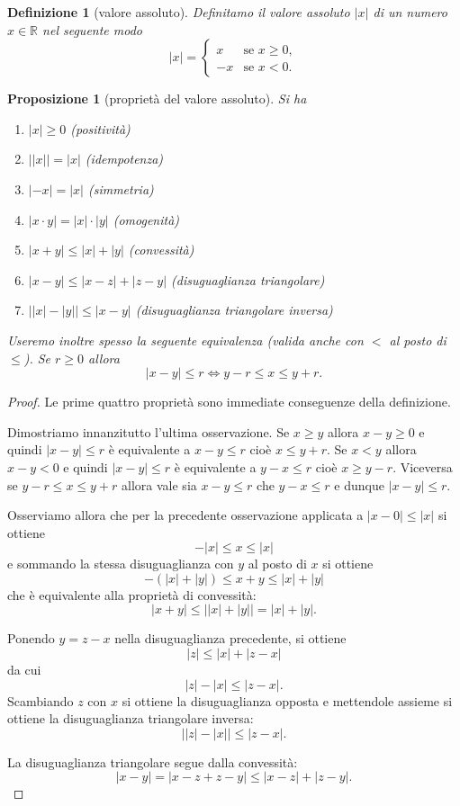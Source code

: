 \documentclass[italian,a4paper,oneside,headinclude]{scrbook}
\newcommand{\myemph}[1]{\emph{#1}\marginpar{#1}}
\newcommand{\RR}{\mathbb R}
\newcommand{\abs}[1]{{\left|#1\right|}}
\newtheorem{proposition}[theorem]{Proposizione}
\newtheorem{definition}[theorem]{Definizione}
\begin{document}
\begin{definition}[valore assoluto]
Definitamo il \myemph{valore assoluto} $\abs{x}$ di un numero $x\in \RR$ nel seguente modo
\[
\abs{x} =
\begin{cases}
  x & \text{se $x\ge 0$}, \\
  -x & \text{se $x<0 $}.
\end{cases}
\]
\end{definition}

\begin{proposition}[proprietà del valore assoluto]
Si ha
\begin{enumerate}
\item $\abs{x}\ge 0$ (positività)
\item $\big\lvert\abs{x}\big\rvert = \abs{x}$ (idempotenza)
\item $\abs{-x} = \abs{x}$ (simmetria)
\item $\abs{x\cdot y} = \abs{x}\cdot \abs{y}$ (omogenità)
\item $\abs{x+y} \le \abs{x} + \abs{y}$ (convessità)
\item $\abs{x-y} \le \abs{x-z} + \abs{z-y}$ (disuguaglianza triangolare)
\item $\big\lvert\abs{x}-\abs{y}\big\rvert \le \abs{x-y}$ (disuguaglianza triangolare inversa)
\end{enumerate}
Useremo inoltre spesso la seguente equivalenza (valida
anche con $<$ al posto di $\le$). Se $r\ge 0$ allora
\[
 \abs{x-y} \le r
 \iff
 y - r \le x \le y + r.
\]
\end{proposition}
%
\begin{proof}
Le prime quattro proprietà sono immediate conseguenze della definizione.

Dimostriamo innanzitutto l'ultima osservazione.
Se $x\ge y$ allora $x-y\ge 0$ e quindi $\abs{x-y} \le r$ è
equivalente a $x-y\le r$ cioè $x\le y+r$.
Se $x<y$ allora $x-y<0$ e quindi $\abs{x-y} \le r$ è
equivalente a $y-x \le r$ cioè $x\ge y-r$.
Viceversa se $y-r \le x \le y+r$ allora vale sia $x-y \le r$ che $y-x \le r$ e dunque $\abs{x-y}\le r$.

Osserviamo allora che per la precedente osservazione applicata
a $\abs{x-0} \le \abs{x}$ si ottiene
\[
  -\abs{x} \le x \le \abs{x}
\]
e sommando la stessa disuguaglianza con $y$ al posto di $x$ si
ottiene
\[
  -(\abs{x} + \abs{y}) \le x + y \le \abs{x} + \abs{y}
\]
che è equivalente alla proprietà di convessità:
\[
  \abs{x+y} \le \big\lvert\abs{x} + \abs{y}\big\rvert = \abs{x} + \abs{y}.
\]

Ponendo $y=z-x$ nella disuguaglianza precedente, si ottiene
\[
  \abs{z} \le \abs{x} + \abs{z-x}
\]
da cui
\[
  \abs{z} - \abs{x} \le \abs{z-x}.
\]
Scambiando $z$ con $x$ si ottiene la disuguaglianza opposta
e mettendole assieme si ottiene
la disuguaglianza triangolare inversa:
\[
\big\lvert \abs{z}-\abs{x} \big\rvert  \le \abs{z-x}.
\]

La disuguaglianza triangolare segue dalla convessità:
\[
 \abs{x-y} = \abs{x-z + z-y} \le \abs{x-z} + \abs{z-y}.
\]



\end{proof}
\end{document}
